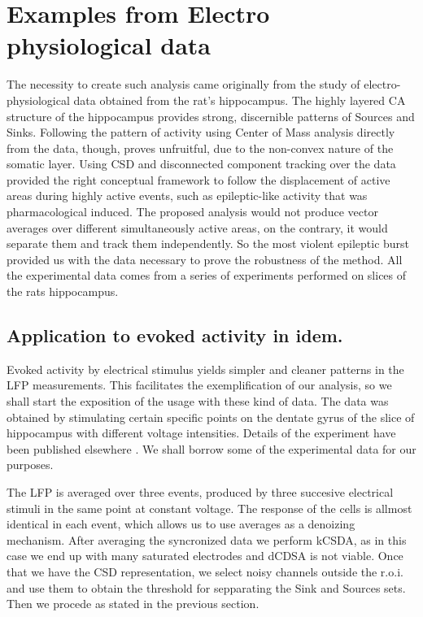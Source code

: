 \documentclass[12pt]{article}
\begin{document}
 
\section{Examples from Electro physiological data}

The necessity to create such analysis came originally from the study of
electro-physiological data obtained from the rat's hippocampus.
The highly layered CA structure of the hippocampus provides strong, discernible patterns of Sources and Sinks. Following the pattern of activity using Center of Mass analysis directly from the data, though, proves unfruitful, due to the non-convex nature of the somatic layer. Using CSD and disconnected component tracking over the data provided the right conceptual framework to follow the displacement of active areas during highly active events, such as epileptic-like activity that was pharmacological induced. The proposed analysis would not produce vector averages over different simultaneously active areas, on the contrary, it would separate them and track them independently. So the most violent epileptic burst provided us with the data necessary to prove the robustness of the method.
All the experimental data comes from a series of experiments
performed on slices of the rats hippocampus. 



\subsection{Application to evoked activity in idem.}\label{sec:evocada}

Evoked activity by electrical stimulus yields simpler and cleaner patterns in the LFP
measurements. This facilitates the exemplification of our analysis, so we shall
start the exposition of the usage with these kind of data.
The data was obtained by stimulating certain specific points on the dentate gyrus
of the slice of hippocampus with different voltage intensities. Details of the experiment
have been published elsewhere \cite{Franco2018}. We shall borrow some of
the experimental data for our purposes.

The LFP is averaged over three events, produced by three succesive
electrical stimuli in the same point at constant voltage. The
response of the cells is allmost identical in each event, which
allows us to use averages as a denoizing mechanism. After averaging
the syncronized data we perform kCSDA, as in this case we end up
with many saturated electrodes and dCDSA is not viable.
Once that we have the CSD representation, we select noisy channels outside
the r.o.i. and use them to obtain the threshold for sepparating
the Sink and Sources sets. Then we procede as stated in the previous section.
\end{document}
